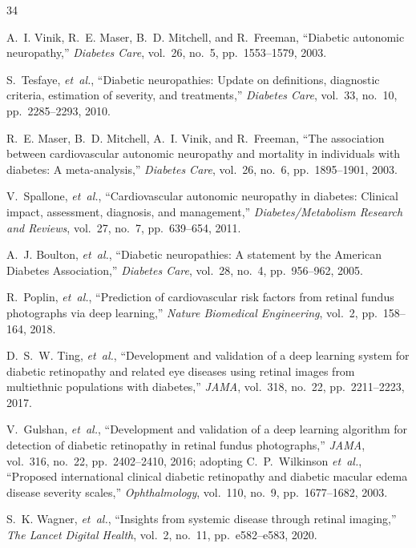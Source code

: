 \documentclass[journal,10pt,twocolumn]{IEEEtran}
\begin{document}
\begin{thebibliography}{34}

A.~I. Vinik, R.~E. Maser, B.~D. Mitchell, and R.~Freeman, ``Diabetic autonomic neuropathy,'' \emph{Diabetes Care}, vol.~26, no.~5, pp.~1553--1579, 2003.

S.~Tesfaye, \emph{et~al.}, ``Diabetic neuropathies: Update on definitions, diagnostic criteria, estimation of severity, and treatments,'' \emph{Diabetes Care}, vol.~33, no.~10, pp.~2285--2293, 2010.

R.~E. Maser, B.~D. Mitchell, A.~I. Vinik, and R.~Freeman, ``The association between cardiovascular autonomic neuropathy and mortality in individuals with diabetes: A meta-analysis,'' \emph{Diabetes Care}, vol.~26, no.~6, pp.~1895--1901, 2003.

V.~Spallone, \emph{et~al.}, ``Cardiovascular autonomic neuropathy in diabetes: Clinical impact, assessment, diagnosis, and management,'' \emph{Diabetes/Metabolism Research and Reviews}, vol.~27, no.~7, pp.~639--654, 2011.

A.~J. Boulton, \emph{et~al.}, ``Diabetic neuropathies: A statement by the American Diabetes Association,'' \emph{Diabetes Care}, vol.~28, no.~4, pp.~956--962, 2005.

R.~Poplin, \emph{et~al.}, ``Prediction of cardiovascular risk factors from retinal fundus photographs via deep learning,'' \emph{Nature Biomedical Engineering}, vol.~2, pp.~158--164, 2018.

D.~S.~W. Ting, \emph{et~al.}, ``Development and validation of a deep learning system for diabetic retinopathy and related eye diseases using retinal images from multiethnic populations with diabetes,'' \emph{JAMA}, vol.~318, no.~22, pp.~2211--2223, 2017.

V.~Gulshan, \emph{et~al.}, ``Development and validation of a deep learning algorithm for detection of diabetic retinopathy in retinal fundus photographs,'' \emph{JAMA}, vol.~316, no.~22, pp.~2402--2410, 2016; adopting C.~P.~Wilkinson \emph{et~al.}, ``Proposed international clinical diabetic retinopathy and diabetic macular edema disease severity scales,'' \emph{Ophthalmology}, vol.~110, no.~9, pp.~1677--1682, 2003.

S.~K. Wagner, \emph{et~al.}, ``Insights from systemic disease through retinal imaging,'' \emph{The Lancet Digital Health}, vol.~2, no.~11, pp.~e582--e583, 2020.


\end{thebibliography}
\end{document}
